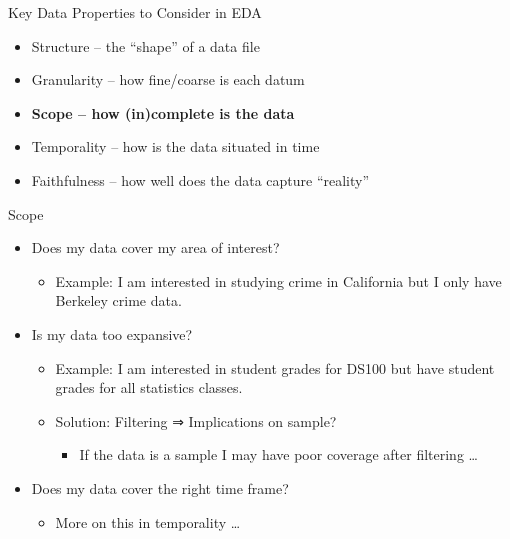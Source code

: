 \documentclass[aspectratio=169]{../latex_main/tntbeamer}  %
\begin{document}
	
	
	\begin{frame}{Key Data Properties to Consider in EDA}
	    \begin{itemize}
	        \item Structure -- the “shape” of a data file
	        \item Granularity -- how fine/coarse is each datum
	        \item \textbf{Scope -- how (in)complete is the data}
	        \item Temporality -- how is the data situated in time
	        \item Faithfulness -- how well does the data capture “reality”
	    \end{itemize}
	\end{frame}
	
	
	
	\begin{frame}{Scope}
	    \begin{itemize}
	        \item Does my data cover my area of interest?
	        \begin{itemize}
	            \item Example: I am interested in studying crime in California but I only have Berkeley crime data. 
	        \end{itemize}
	        \item Is my data too expansive?
	        \begin{itemize}
	            \item Example: I am interested in student grades for DS100 but have student grades for all statistics classes.
	            \item Solution: Filtering ⇒ Implications on sample?
	            \begin{itemize}
	                \item If the data is a sample I may have poor coverage after filtering …
	            \end{itemize}
	        \end{itemize}
	        \item Does my data cover the right time frame?
	        \begin{itemize}
	            \item More on this in temporality … 
	        \end{itemize}
	    \end{itemize}
	\end{frame}
	
\end{document}
